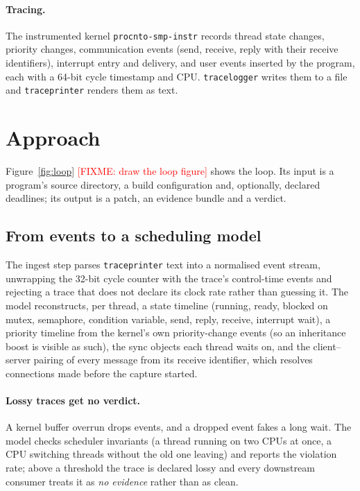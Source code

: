 \documentclass[sigconf,review]{acmart}
\newcommand{\fixme}[1]{\textcolor{red}{[FIXME: #1]}\typeout{FIXME: #1}}
\newcommand{\qnx}[1]{\texttt{#1}}
\begin{document}
\paragraph{Tracing.} The instrumented kernel \qnx{procnto-smp-instr} records thread state changes, priority changes,
communication events (send, receive, reply with their receive identifiers), interrupt entry and delivery, and user events
inserted by the program, each with a 64-bit cycle timestamp and CPU. \qnx{tracelogger} writes them to a file and
\qnx{traceprinter} renders them as text.

\section{Approach}
\label{sec:approach}

Figure~\ref{fig:loop} \fixme{draw the loop figure} shows the loop. Its input is a program's source directory, a build
configuration and, optionally, declared deadlines; its output is a patch, an evidence bundle and a verdict.

\subsection{From events to a scheduling model}

The ingest step parses \qnx{traceprinter} text into a normalised event stream, unwrapping the 32-bit cycle counter with the
trace's control-time events and rejecting a trace that does not declare its clock rate rather than guessing it. The model
reconstructs, per thread, a state timeline (running, ready, blocked on mutex, semaphore, condition variable, send, reply,
receive, interrupt wait), a priority timeline from the kernel's own priority-change events (so an inheritance boost is visible
as such), the sync objects each thread waits on, and the client--server pairing of every message from its receive identifier,
which resolves connections made before the capture started.

\paragraph{Lossy traces get no verdict.} A kernel buffer overrun drops events, and a dropped event fakes a long wait. The model
checks scheduler invariants (a thread running on two CPUs at once, a CPU switching threads without the old one leaving) and
reports the violation rate; above a threshold the trace is declared lossy and every downstream consumer treats it as
\emph{no evidence} rather than as clean.
\end{document}
